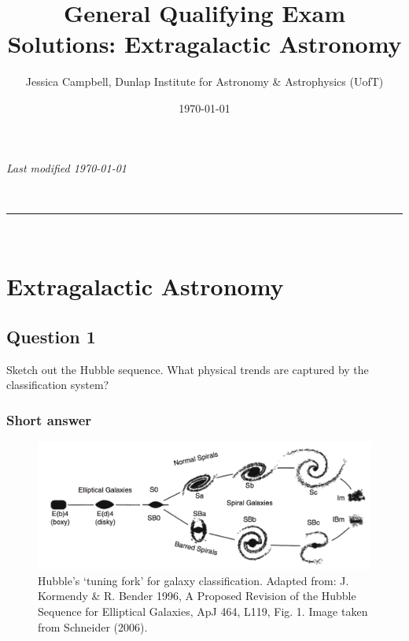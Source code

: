 \documentclass[a4paper,11pt]{article}
\makeatletter
\newcommand{\linia}{\rule{\linewidth}{0.5pt}}
\renewcommand{\maketitle}{
\begin{center}
\vspace{2ex}
{\huge \textsc{\@title}}
\vspace{1ex}
\\
\linia\\
\@author
\vspace{4ex}
\end{center}
}
\makeatother
\begin{document}
\hfill{\textit{Last modified \today}}
\title{General Qualifying Exam Solutions: Extragalactic Astronomy}
\author{Jessica Campbell, Dunlap Institute for Astronomy \& Astrophysics (UofT)}
\date{\today}
\maketitle

\tableofcontents


%
%
%
%

\newpage
\section{Extragalactic Astronomy}


\subsection{Question 1}

Sketch out the Hubble sequence. What physical trends are captured by the classification system?

\subsubsection{Short answer}

\begin{figure}[h]
    \centering
    \includegraphics[width=16cm]{figures/HubbleSequence.png}
    \caption{\footnotesize{Hubble’s `tuning fork' for galaxy classification. Adapted from: J. Kormendy \& R. Bender 1996, A Proposed Revision of the Hubble Sequence for Elliptical Galaxies, ApJ 464, L119, Fig. 1. Image taken from Schneider (2006).}}
    \label{fig:hubblesequence}
\end{figure}
\end{document}
